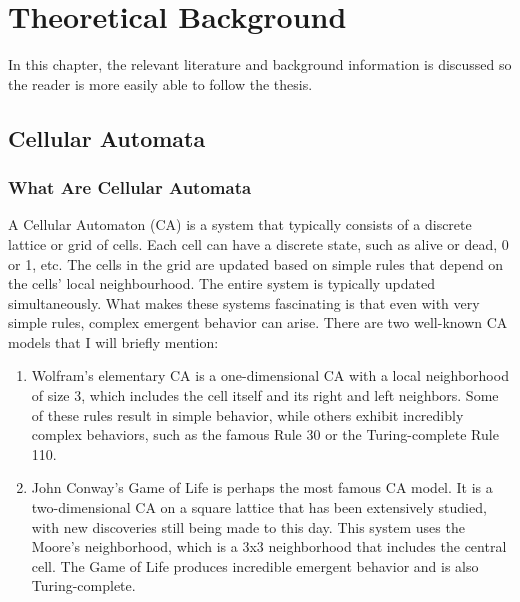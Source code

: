 
\chapter{Theoretical Background} %
\label{Chapter2} %
In this chapter, the relevant literature and background information is discussed so the reader is more easily able to follow the thesis. 
\section{Cellular Automata}
\subsection{What Are Cellular Automata}
A Cellular Automaton (CA) is a system that typically consists of a discrete lattice or grid of cells.
Each cell can have a discrete state, such as alive or dead, 0 or 1, etc. The cells in the grid are updated
based on simple rules that depend on the cells’ local neighbourhood. The entire system is typically
updated simultaneously. What makes these systems fascinating is that even with very simple rules,
complex emergent behavior can arise.
There are two well-known CA models that I will briefly mention:

\begin{enumerate}
	\item Wolfram’s elementary CA is a one-dimensional CA with a local neighborhood of size 3, which
	includes the cell itself and its right and left neighbors. Some of these rules result in simple
	behavior, while others exhibit incredibly complex behaviors, such as the famous Rule 30 or the
	Turing-complete Rule 110.
	\item John Conway’s Game of Life is perhaps the most famous CA model. It is a two-dimensional
	CA on a square lattice that has been extensively studied, with new discoveries still being made
	to this day. This system uses the Moore’s neighborhood, which is a 3x3 neighborhood that
	includes the central cell. The Game of Life produces incredible emergent behavior and is also
	Turing-complete.
\end{enumerate}


